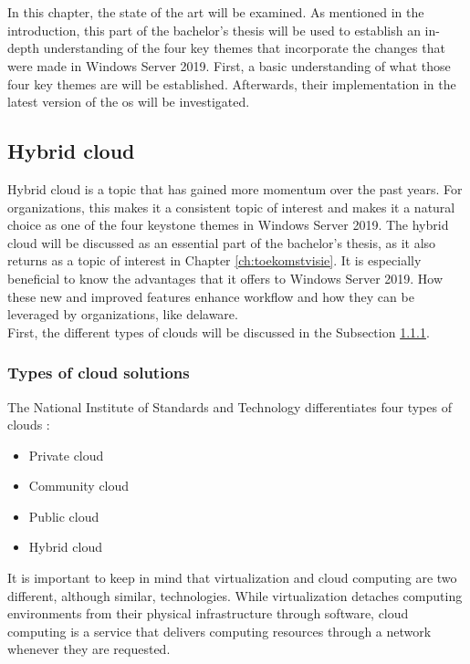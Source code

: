 \chapter{}
\label{ch:stand-van-zaken}
In this chapter, the state of the art will be examined. 
As mentioned in the introduction, this part of the bachelor's thesis will be used to establish an in-depth understanding of the four key themes that incorporate the changes that were made in Windows Server 2019. 
First, a basic understanding of what those four key themes are will be established. 
Afterwards, their implementation in the latest version of the \acrshort{os} will be investigated.

\section{Hybrid cloud}
Hybrid cloud is a topic that has gained more momentum over the past years. 
For organizations, this makes it a consistent topic of interest and makes it a natural choice as one of the four keystone themes in Windows Server 2019. \autocite{MWST2018} 
The hybrid cloud will be discussed as an essential part of the bachelor's thesis, as it also returns as a topic of interest in Chapter \ref{ch:toekomstvisie}.
It is especially beneficial to know the advantages that it offers to Windows Server 2019.
How these new and improved features enhance workflow and how they can be leveraged by organizations, like delaware. \\
First, the different types of clouds will be discussed in the Subsection \ref{subsection:typesofcloud}.

\subsection{Types of cloud solutions}
\label{subsection:typesofcloud}
The National Institute of Standards and Technology differentiates four types of clouds \autocite{Mell2011}:
\begin{itemize}
	\item Private cloud
	\item Community cloud
	\item Public cloud
	\item Hybrid cloud
\end{itemize}	
It is important to keep in mind that virtualization and cloud computing are two different, although similar, technologies. 
While virtualization detaches computing environments from their physical infrastructure through software, cloud computing is a service that delivers computing resources through a network whenever they are requested. \autocite{Naeem2016}

